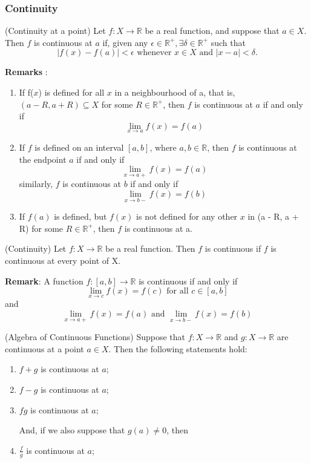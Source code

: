 \documentclass[12pt]{article}
\begin{document}
		\subsubsection{Continuity}

			\begin{defn}
				(Continuity at a point) Let $f : X \to \mathbb{R}$ be a real function, and suppose that $a \in X$. 							Then $f$ is continuous at $a$ if, given any $\epsilon \in \mathbb{R}^+, \exists \delta \in 							\mathbb{R}^+$ such that
						\[
							|f(x) - f(a)| < \epsilon \mbox{    whenever    } x \in X \mbox {    and    } 										|x - a| < \delta.
						\]
			\end{defn}

			{\bf{Remarks}} :
					\begin{enumerate}
						\item If f($x$) is defined for all $x$ in a neighbourhood of a, that is, $(a - R, a + R) 								\subseteq X$ for some $R \in \mathbb{R}^+$, then $f$ is continuous at 									$a$ if and only if
							\[
								\lim_{x \to a}{f(x)} = f(a)
							\] 
						\item If $f$ is defined on an interval $[a,b]$, where $a,b \in \mathbb{R}$, then $f$ 								is continuous at the endpoint $a$ if and only if
							\[
								\lim_{x \to a+}{f(x)} = f(a)
							\] 
							similarly, $f$ is continuous at $b$ if and only if
							\[
								\lim_{x \to b-}{f(x)} = f(b)
							\] 
						\item If $f(a)$ is defined, but $f(x)$ is not defined for any other $x$ in (a - R, a + R) 							for some $R \in \mathbb{R}^+$, then $f$ is continuous at a.
					\end{enumerate}

			\begin{defn}
				(Continuity) Let $f : X \to \mathbb{R}$ be a real function. Then $f$ is continuous if $f$ is 								continuous at every point of X.
			\end{defn}

			{\bf{Remark}}: A function $f : [a,b] \to \mathbb{R}$ is continuous if and only if
							\[
								\lim_{x \to c}{f(x)} = f(c) \mbox {   for all   } c \in [a,b]
							\] 
						and
							\[
								\lim_{x \to a+}{f(x)} = f(a)  \mbox{    and    } \lim_{x \to b-}{f(x)} = 									 f(b)
							\] 
			
			\begin{thm}
			(Algebra of Continuous Functions) Suppose that $f : X \to \mathbb{R}$ and $g : X \to \mathbb{R}$ are 						continuous at a point $a \in X$. Then the following statements hold:
				\begin{enumerate}
					\item $f + g$ is continuous at $a$;
					\item $f - g$ is continuous at $a$;
					\item $fg$ is continuous at $a$;

				And, if we also suppose that $g(a) \neq 0$, then

					\item $\frac{f}{g}$ is continuous at $a$;
				\end{enumerate}
			\end{thm}
\end{document}
